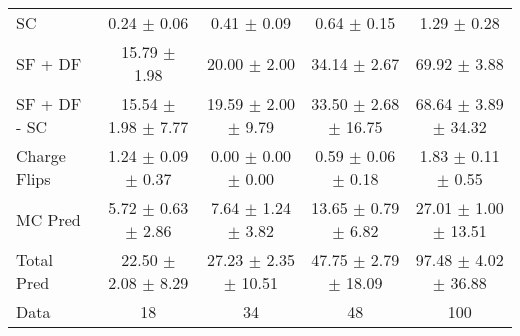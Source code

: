 \begin{tabular}{l|cccc}
                                 SC &  0.24 $\pm$  0.06 &  0.41 $\pm$  0.09 &  0.64 $\pm$  0.15 &  1.29 $\pm$  0.28 \\
                            SF + DF & 15.79 $\pm$  1.98 & 20.00 $\pm$  2.00 & 34.14 $\pm$  2.67 & 69.92 $\pm$  3.88 \\
\hline
                       SF + DF - SC & 15.54 $\pm$  1.98 $\pm$  7.77 & 19.59 $\pm$  2.00 $\pm$  9.79 & 33.50 $\pm$  2.68 $\pm$ 16.75 & 68.64 $\pm$  3.89 $\pm$ 34.32 \\
\hline\hline
                       Charge Flips &  1.24 $\pm$  0.09 $\pm$  0.37 &  0.00 $\pm$  0.00 $\pm$  0.00 &  0.59 $\pm$  0.06 $\pm$  0.18 &  1.83 $\pm$  0.11 $\pm$  0.55 \\
\hline
                            MC Pred &  5.72 $\pm$  0.63 $\pm$  2.86 &  7.64 $\pm$  1.24 $\pm$  3.82 & 13.65 $\pm$  0.79 $\pm$  6.82 & 27.01 $\pm$  1.00 $\pm$ 13.51 \\
\hline
                         Total Pred & 22.50 $\pm$  2.08 $\pm$  8.29 & 27.23 $\pm$  2.35 $\pm$ 10.51 & 47.75 $\pm$  2.79 $\pm$ 18.09 & 97.48 $\pm$  4.02 $\pm$ 36.88 \\
\hline\hline
                               Data &    18 &    34 &    48 &   100 \\
\hline\hline
\end{tabular}

